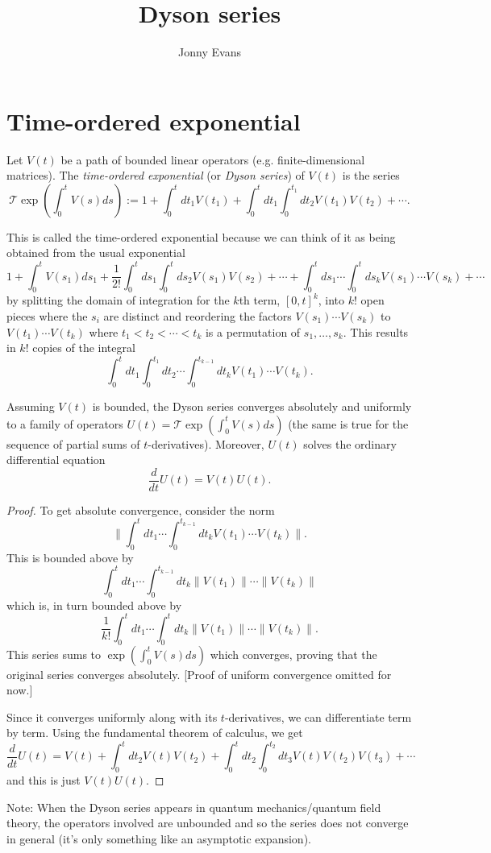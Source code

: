 \documentclass{amsart}
\title{Dyson series}
\author{Jonny Evans}
\begin{document}
\section{Time-ordered exponential}

\begin{Definition}
  Let $V(t)$ be a path of bounded linear operators (e.g. finite-dimensional matrices). The {\em time-ordered exponential} (or {\em Dyson series}) of $V(t)$ is the series
  \[\mathcal{T}\exp\left(\int_0^tV(s)ds\right):=1+\int_0^tdt_1V(t_1)+\int_0^tdt_1\int_0^{t_1}dt_2V(t_1)V(t_2)+\cdots.\]
\end{Definition}

This is called the time-ordered exponential because we can think of it as being obtained from the usual exponential
\[1+\int_0^tV(s_1)ds_1+\frac{1}{2!}\int_0^tds_1\int_0^tds_2V(s_1)V(s_2)+\cdots+\int_0^tds_1\cdots\int_0^tds_kV(s_1)\cdots V(s_k)+\cdots\]
by splitting the domain of integration for the $k$th term, $[0,t]^k$, into $k!$ open pieces where the $s_i$ are distinct and reordering the factors $V(s_1)\cdots V(s_k)$ to $V(t_1)\cdots V(t_k)$ where $t_1\lt t_2\lt \cdots\lt t_k$ is a permutation of $s_1,\ldots,s_k$. This results in $k!$ copies of the integral
\[\int_0^tdt_1\int_0^{t_1}dt_2\cdots\int_0^{t_{k-1}}dt_kV(t_1)\cdots V(t_k).\]

\begin{Theorem}
  Assuming $V(t)$ is bounded, the Dyson series converges absolutely and uniformly to a family of operators $U(t)=\mathcal{T}\exp\left(\int_0^tV(s)ds\right)$ (the same is true for the sequence of partial sums of $t$-derivatives). Moreover, $U(t)$ solves the ordinary differential equation
  \[\frac{d}{dt}U(t)=V(t)U(t).\]
\end{Theorem}
\begin{proof}
  To get absolute convergence, consider the norm
  \[\|\int_0^tdt_1\cdots\int_0^{t_{k-1}}dt_kV(t_1)\cdots V(t_k)\|.\]
  This is bounded above by
  \[\int_0^tdt_1\cdots\int_0^{t_{k-1}}dt_k\|V(t_1)\|\cdots\|V(t_k)\|\]
  which is, in turn bounded above by
  \[\frac{1}{k!}\int_0^tdt_1\cdots\int_0^t dt_k\|V(t_1)\|\cdots\|V(t_k)\|.\]
  This series sums to $\exp\left(\int_0^tV(s)ds\right)$ which converges, proving that the original series converges absolutely. [Proof of uniform convergence omitted for now.]
  
  Since it converges uniformly along with its $t$-derivatives, we can differentiate term by term. Using the fundamental theorem of calculus, we get
  \[\frac{d}{dt}U(t)=V(t)+\int_0^tdt_2V(t)V(t_2)+\int_0^tdt_2\int_0^{t_2}dt_3V(t)V(t_2)V(t_3)+\cdots\]
  and this is just $V(t)U(t)$.
\end{proof}

Note: When the Dyson series appears in quantum mechanics/quantum field theory, the operators involved are unbounded and so the series does not converge in general (it's only something like an asymptotic expansion).
\end{document}
